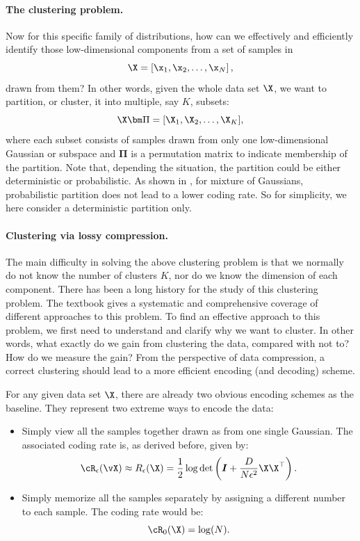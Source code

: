 \documentclass[../../book-main.tex]{subfiles}
\begin{document}
\paragraph{The clustering problem.}
Now for this specific family of distributions, how can we effectively and efficiently identify those low-dimensional components from a set of samples in
\begin{equation}
	\X = \left[\x_1, \x_2, \ldots, \x_N\right],
\end{equation}
drawn from them? In other words, given the whole data set $\X$, we want to partition, or cluster, it into multiple, say $K$, subsets:
\begin{equation}
	\X\bm \Pi = [\X_1, \X_2, \dots, \X_K],
\end{equation}
where each subset consists of samples drawn from only one low-dimensional Gaussian or subspace and $\bm \Pi$ is a permutation matrix to indicate membership of the partition. Note that, depending the situation, the partition could be either deterministic or probabilistic. As shown in \cite{ma2007segmentation}, for mixture of Gaussians, probabilistic partition does not lead to a lower coding rate. So for simplicity, we here consider a deterministic partition only.

\paragraph{Clustering via lossy compression.}
The main difficulty in solving the above clustering problem is that we normally do not know the number of clusters $K$, nor do we know the dimension of each component. There has been a long history for the study of this clustering problem. The textbook \cite{GPCA} gives a systematic and comprehensive coverage of different approaches to this problem. To find an effective approach to this problem, we first need to understand and clarify why we want to cluster. In other words, what exactly do we gain from clustering the data, compared with not to? How do we measure the gain? From the perspective of data compression, a correct clustering should lead to a more efficient encoding (and decoding) scheme.

For any given data set $\X$, there are already two obvious encoding schemes as the baseline. They represent two extreme ways to encode the data:
\begin{itemize}
	\item Simply view all the samples together drawn as from one single Gaussian. The associated coding rate is, as derived before, given by:
	      \begin{equation}
		      \cR_{\epsilon}(\vX) \approx R_{\epsilon}(\X) = \frac{1}{2} \log \det \left(\boldsymbol{I} + \frac{D}{N\epsilon^2} \X\X^\top \right).
	      \end{equation}
	\item Simply memorize all the samples separately by assigning a different number to each sample. The coding rate would be:
	      \begin{equation}
		      \cR_0(\X) = \log(N).
	      \end{equation}
\end{itemize}
\end{document}
